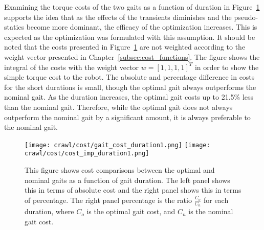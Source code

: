 Examining the torque costs of the two gaits as a function of duration
in Figure~\ref{fig:cost_duration1} supports
the idea that as the effects of the transients diminishes and the pseudo-statics
become more dominant, the efficacy of the optimization increases.
This is expected as the optimization was formulated with this assumption. 
It should be noted that the costs presented in Figure~\ref{fig:cost_duration1}
are not weighted according to the weight vector presented in Chapter~\ref{subsec:cost_functions}.
The figure shows the integral of the costs with the weight vector $w = [1, 1, 1, 1]^T$
in order to show the simple torque cost to the robot. 
The absolute and percentage difference in costs for the short durations is small,
though the optimal gait always outperforms the nominal gait.
As the duration increases, the optimal gait costs up to 21.5\% less than the
nominal gait. Therefore, while the optimal gait does not always outperform the
nominal gait by a significant amount, it is always preferable to the nominal gait.

\begin{figure}
  \texttt{[image: crawl/cost/gait\_cost\_duration1.png]}
  \texttt{[image: crawl/cost/cost\_imp\_duration1.png]}
  \caption{This figure shows cost comparisons between the optimal and
           nominal gaits as a function of gait duration. The left panel shows
           this in terms of absolute cost and the right panel shows this in 
           terms of percentage. The right panel percentage is the ratio $\frac{C_o}{C_n}$
           for each duration, where $C_o$ is the optimal gait cost, and $C_n$ is the nominal gait cost.}
  \label{fig:cost_duration1}
\end{figure}
